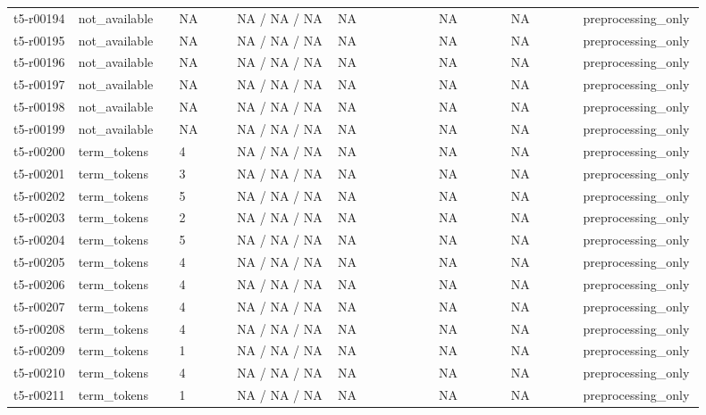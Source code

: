 \begin{longtable}{@{}p{0.09\linewidth}p{0.14\linewidth}p{0.08\linewidth}p{0.14\linewidth}p{0.14\linewidth}p{0.1\linewidth}p{0.1\linewidth}p{0.11\linewidth}@{}}
t5-r00194 & not\_\allowbreak{}available & NA & NA / NA / NA & NA & NA & NA & preprocessing\_\allowbreak{}only \\
t5-r00195 & not\_\allowbreak{}available & NA & NA / NA / NA & NA & NA & NA & preprocessing\_\allowbreak{}only \\
t5-r00196 & not\_\allowbreak{}available & NA & NA / NA / NA & NA & NA & NA & preprocessing\_\allowbreak{}only \\
t5-r00197 & not\_\allowbreak{}available & NA & NA / NA / NA & NA & NA & NA & preprocessing\_\allowbreak{}only \\
t5-r00198 & not\_\allowbreak{}available & NA & NA / NA / NA & NA & NA & NA & preprocessing\_\allowbreak{}only \\
t5-r00199 & not\_\allowbreak{}available & NA & NA / NA / NA & NA & NA & NA & preprocessing\_\allowbreak{}only \\
t5-r00200 & term\_\allowbreak{}tokens & 4 & NA / NA / NA & NA & NA & NA & preprocessing\_\allowbreak{}only \\
t5-r00201 & term\_\allowbreak{}tokens & 3 & NA / NA / NA & NA & NA & NA & preprocessing\_\allowbreak{}only \\
t5-r00202 & term\_\allowbreak{}tokens & 5 & NA / NA / NA & NA & NA & NA & preprocessing\_\allowbreak{}only \\
t5-r00203 & term\_\allowbreak{}tokens & 2 & NA / NA / NA & NA & NA & NA & preprocessing\_\allowbreak{}only \\
t5-r00204 & term\_\allowbreak{}tokens & 5 & NA / NA / NA & NA & NA & NA & preprocessing\_\allowbreak{}only \\
t5-r00205 & term\_\allowbreak{}tokens & 4 & NA / NA / NA & NA & NA & NA & preprocessing\_\allowbreak{}only \\
t5-r00206 & term\_\allowbreak{}tokens & 4 & NA / NA / NA & NA & NA & NA & preprocessing\_\allowbreak{}only \\
t5-r00207 & term\_\allowbreak{}tokens & 4 & NA / NA / NA & NA & NA & NA & preprocessing\_\allowbreak{}only \\
t5-r00208 & term\_\allowbreak{}tokens & 4 & NA / NA / NA & NA & NA & NA & preprocessing\_\allowbreak{}only \\
t5-r00209 & term\_\allowbreak{}tokens & 1 & NA / NA / NA & NA & NA & NA & preprocessing\_\allowbreak{}only \\
t5-r00210 & term\_\allowbreak{}tokens & 4 & NA / NA / NA & NA & NA & NA & preprocessing\_\allowbreak{}only \\
t5-r00211 & term\_\allowbreak{}tokens & 1 & NA / NA / NA & NA & NA & NA & preprocessing\_\allowbreak{}only \\

\end{longtable}
